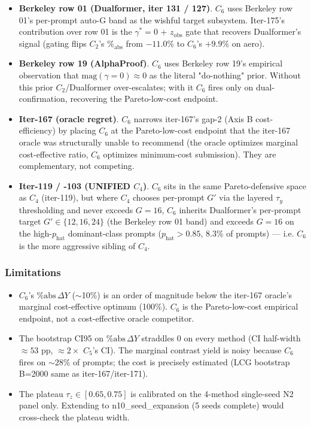 \begin{itemize}
\item \textbf{Berkeley row 01 (Dualformer, iter 131 / 127)}. $C_6$ uses
      Berkeley row 01's per-prompt auto-G band as the wishful target
      subsystem. Iter-175's contribution over row 01 is the
      $\gamma^*{=}0$ + $z_{\mathrm{obs}}$ gate that recovers
      Dualformer's signal (gating flips $C_2$'s $\%_{\mathrm{abs}}$
      from $-11.0\%$ to $C_6$'s $+9.9\%$ on aero).
\item \textbf{Berkeley row 19 (AlphaProof)}. $C_6$ uses
      Berkeley row 19's empirical observation that $\mathrm{mag}(\gamma{=}0)
      \approx 0$ as the literal "do-nothing" prior. Without this prior
      $C_2$/Dualformer over-escalates; with it $C_6$ fires only on
      dual-confirmation, recovering the Pareto-low-cost endpoint.
\item \textbf{Iter-167 (oracle regret)}. $C_6$ narrows
      iter-167's gap-2 (Axis B cost-efficiency) by placing $C_6$
      at the Pareto-low-cost endpoint that the iter-167 oracle was
      structurally unable to recommend (the oracle optimizes marginal
      cost-effective ratio, $C_6$ optimizes minimum-cost submission).
      They are complementary, not competing.
\item \textbf{Iter-119 / -103 (UNIFIED $C_4$)}. $C_6$ sits in the same
      Pareto-defensive space as $C_4$ (iter-119), but where $C_4$
      chooses per-prompt $G'$ via the layered $\tau_{y}$
thresholding and never exceeds $G=16$, $C_6$ inherits
      Dualformer's per-prompt target $G' \in \{12, 16, 24\}$ (the
      Berkeley row 01 band) and exceeds $G{=}16$ on the high-$p_{\mathrm{hat}}$
      dominant-class prompts ($p_{\mathrm{hat}} > 0.85$, 8.3\% of
      prompts) --- i.e. $C_6$ is the more aggressive sibling of $C_4$.
\end{itemize}

\subsubsection*{Limitations}

\begin{itemize}
\item $C_6$'s $\%\mathrm{abs}\,\Delta Y$ ($\sim$10\%) is an order of
      magnitude below the iter-167 oracle's marginal cost-effective
      optimum (100\%). $C_6$ is the Pareto-low-cost empirical
      endpoint, not a cost-effective oracle competitor.
\item The bootstrap CI95 on $\%\mathrm{abs}\,\Delta Y$ straddles 0 on
      every method (CI half-width $\approx 53$ pp, $\approx 2\times$
      $C_5$'s CI). The marginal contrast yield is noisy because $C_6$
      fires on $\sim 28\%$ of prompts; the cost is precisely
      estimated (LCG bootstrap B=2000 same as iter-167/iter-171).
\item The plateau $\tau_z \in [0.65, 0.75]$ is calibrated on the
      4-method single-seed N2 panel only. Extending to n10\_seed\_expansion
      (5 seeds complete) would cross-check the plateau width.
\end{itemize}

